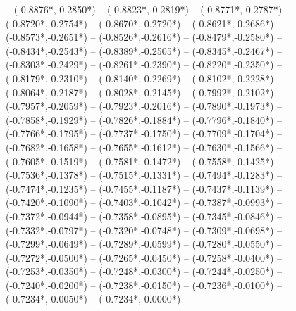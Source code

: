 {	-- ({-0.8876*\dx},{-0.2850*\dy})
	-- ({-0.8823*\dx},{-0.2819*\dy})
	-- ({-0.8771*\dx},{-0.2787*\dy})
	-- ({-0.8720*\dx},{-0.2754*\dy})
	-- ({-0.8670*\dx},{-0.2720*\dy})
	-- ({-0.8621*\dx},{-0.2686*\dy})
	-- ({-0.8573*\dx},{-0.2651*\dy})
	-- ({-0.8526*\dx},{-0.2616*\dy})
	-- ({-0.8479*\dx},{-0.2580*\dy})
	-- ({-0.8434*\dx},{-0.2543*\dy})
	-- ({-0.8389*\dx},{-0.2505*\dy})
	-- ({-0.8345*\dx},{-0.2467*\dy})
	-- ({-0.8303*\dx},{-0.2429*\dy})
	-- ({-0.8261*\dx},{-0.2390*\dy})
	-- ({-0.8220*\dx},{-0.2350*\dy})
	-- ({-0.8179*\dx},{-0.2310*\dy})
	-- ({-0.8140*\dx},{-0.2269*\dy})
	-- ({-0.8102*\dx},{-0.2228*\dy})
	-- ({-0.8064*\dx},{-0.2187*\dy})
	-- ({-0.8028*\dx},{-0.2145*\dy})
	-- ({-0.7992*\dx},{-0.2102*\dy})
	-- ({-0.7957*\dx},{-0.2059*\dy})
	-- ({-0.7923*\dx},{-0.2016*\dy})
	-- ({-0.7890*\dx},{-0.1973*\dy})
	-- ({-0.7858*\dx},{-0.1929*\dy})
	-- ({-0.7826*\dx},{-0.1884*\dy})
	-- ({-0.7796*\dx},{-0.1840*\dy})
	-- ({-0.7766*\dx},{-0.1795*\dy})
	-- ({-0.7737*\dx},{-0.1750*\dy})
	-- ({-0.7709*\dx},{-0.1704*\dy})
	-- ({-0.7682*\dx},{-0.1658*\dy})
	-- ({-0.7655*\dx},{-0.1612*\dy})
	-- ({-0.7630*\dx},{-0.1566*\dy})
	-- ({-0.7605*\dx},{-0.1519*\dy})
	-- ({-0.7581*\dx},{-0.1472*\dy})
	-- ({-0.7558*\dx},{-0.1425*\dy})
	-- ({-0.7536*\dx},{-0.1378*\dy})
	-- ({-0.7515*\dx},{-0.1331*\dy})
	-- ({-0.7494*\dx},{-0.1283*\dy})
	-- ({-0.7474*\dx},{-0.1235*\dy})
	-- ({-0.7455*\dx},{-0.1187*\dy})
	-- ({-0.7437*\dx},{-0.1139*\dy})
	-- ({-0.7420*\dx},{-0.1090*\dy})
	-- ({-0.7403*\dx},{-0.1042*\dy})
	-- ({-0.7387*\dx},{-0.0993*\dy})
	-- ({-0.7372*\dx},{-0.0944*\dy})
	-- ({-0.7358*\dx},{-0.0895*\dy})
	-- ({-0.7345*\dx},{-0.0846*\dy})
	-- ({-0.7332*\dx},{-0.0797*\dy})
	-- ({-0.7320*\dx},{-0.0748*\dy})
	-- ({-0.7309*\dx},{-0.0698*\dy})
	-- ({-0.7299*\dx},{-0.0649*\dy})
	-- ({-0.7289*\dx},{-0.0599*\dy})
	-- ({-0.7280*\dx},{-0.0550*\dy})
	-- ({-0.7272*\dx},{-0.0500*\dy})
	-- ({-0.7265*\dx},{-0.0450*\dy})
	-- ({-0.7258*\dx},{-0.0400*\dy})
	-- ({-0.7253*\dx},{-0.0350*\dy})
	-- ({-0.7248*\dx},{-0.0300*\dy})
	-- ({-0.7244*\dx},{-0.0250*\dy})
	-- ({-0.7240*\dx},{-0.0200*\dy})
	-- ({-0.7238*\dx},{-0.0150*\dy})
	-- ({-0.7236*\dx},{-0.0100*\dy})
	-- ({-0.7234*\dx},{-0.0050*\dy})
	-- ({-0.7234*\dx},{-0.0000*\dy})
}
